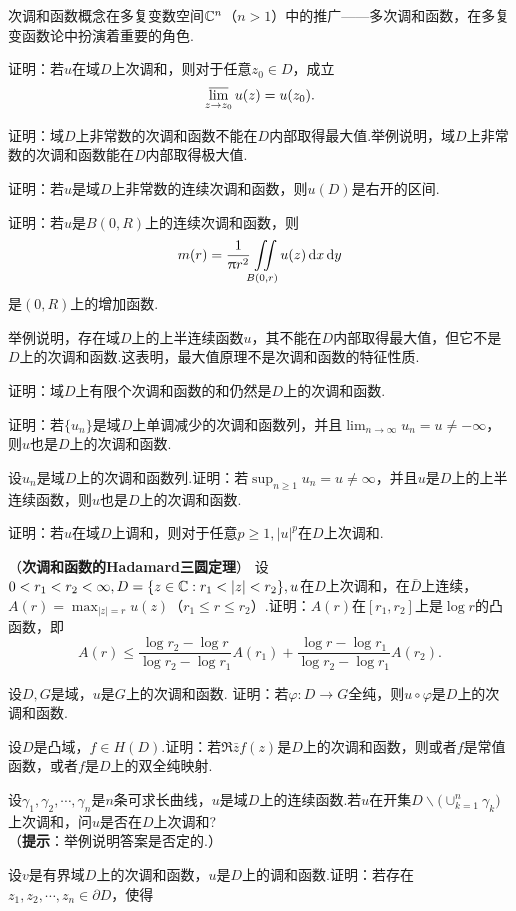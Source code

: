 次调和函数概念在多复变数空间$\mathbb C^n$（$n>1$）中的推广——多次调和函数，在多复变函数论中扮演着重要的角色.
\begin{xiti}
\item 证明：若$u$在域$D$上次调和，则对于任意$z_0\in D$，成立
\[\varlimsup_{z\to z_0}u(z)=u(z_0).\]
\item 证明：域$D$上非常数的次调和函数不能在$D$内部取得最大值.举例说明，域$D$上非常数的次调和函数能在$D$内部取得极大值.
\item 证明：若$u$是域$D$上非常数的连续次调和函数，则$u(D)$是右开的区间.
\item 证明：若$u$是$B(0,R)$上的连续次调和函数，则
\[m(r)=\frac1{\uppi r^2}\iint\limits_{B(0,r)}u(z)\mathop{}\!\mathrm dx\mathop{}\!\mathrm dy\]
是$(0,R)$上的增加函数.
\item 举例说明，存在域$D$上的上半连续函数$u$，其不能在$D$内部取得最大值，但它不是$D$上的次调和函数.这表明，最大值原理不是次调和函数的特征性质.
\item 证明：域$D$上有限个次调和函数的和仍然是$D$上的次调和函数.
\item 证明：若$\{u_n\}$是域$D$上单调减少的次调和函数列，并且$\lim_{n\to\infty}u_n=u\ne-\infty$，则$u$也是$D$上的次调和函数.
\item 设${u_n}$是域$D$上的次调和函数列.证明：若$\sup_{n\ge1}u_n=u\ne\infty$，并且$u$是$D$上的上半连续函数，则$u$也是$D$上的次调和函数.
\item 证明：若$u$在域$D$上调和，则对于任意$p\ge1,|u|^p$在$D$上次调和.
\item （\textbf{次调和函数的Hadamard三圆定理}）
设$0<r_1<r_2<\infty,D=\{z\in\MC:r_1<|z|<r_2\},u$在$D$上次调和，在$\bar D$上连续，$A(r)=\max_{|z|=r}u(z)$（$r_1\le r\le r_2$）.证明：$A(r)$在$[r_1,r_2]$上是$\log r$的凸函数，即
\[A(r)\le\frac{\log r_2-\log r}{\log r_2-\log r_1}A(r_1)+\frac{\log r-\log r_1}
{\log r_2-\log r_1}A(r_2).\]
\item 设$D,G$是域，$u$是$G$上的次调和函数. 证明：若$\varphi:D\to G$全纯，则$u\circ \varphi$是$D$上的次调和函数.
\item 设$D$是凸域，$f\in H(D)$.证明：若$\Re\bar zf(z)$是$D$上的次调和函数，则或者$f$是常值函数，或者$f$是$D$上的双全纯映射.
\item 设$\gamma_1,\gamma_2,\cdots,\gamma_n$是$n$条可求长曲线，$u$是域$D$上的连续函数.若$u$在开集$D\backslash\big(\operatorname*{\cup}_{k=1}^n\gamma_k\big)$上次调和，问$u$是否在$D$上次调和?\\
（\textbf{提示}：举例说明答案是否定的.）
\item 设$v$是有界域$D$上的次调和函数，$u$是$D$上的调和函数.证明：若存在$z_1,z_2,\cdots,z_n\in\partial D $，使得

\end{xiti}
